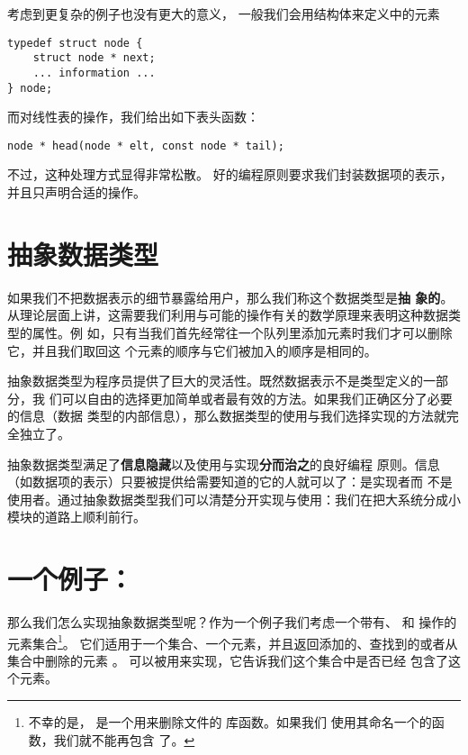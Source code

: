 考虑到更复杂的例子也没有更大的意义，
一般我们会用结构体来定义中的元素
\begin{lstlisting}
typedef struct node {
	struct node * next;
	... information ...
} node;
\end{lstlisting}
而对线性表的操作，我们给出如下表头函数：
\begin{lstlisting}
node * head(node * elt, const node * tail);
\end{lstlisting}

不过，这种处理方式显得非常松散。
好的编程原则要求我们封装数据项的表示，并且只声明合适的操作。

\section{抽象数据类型}

如果我们不把数据表示的细节暴露给用户，那么我们称这个数据类型是\textbf{抽
象的}。
从理论层面上讲，这需要我们利用与可能的操作有关的数学原理来表明这种数据类型的属性。例
如，只有当我们首先经常往一个队列里添加元素时我们才可以删除它，并且我们取回这
个元素的顺序与它们被加入的顺序是相同的。

抽象数据类型为程序员提供了巨大的灵活性。既然数据表示不是类型定义的一部分，我
们可以自由的选择更加简单或者最有效的方法。如果我们正确区分了必要的信息（数据
类型的内部信息），那么数据类型的使用与我们选择实现的方法就完全独立了。

抽象数据类型满足了\textbf{信息隐藏}以及使用与实现\textbf{分而治之}的良好编程
原则。信息（如数据项的表示）只要被提供给需要知道的它的人就可以了：是实现者而
不是使用者。通过抽象数据类型我们可以清楚分开实现与使用：我们在把大系统分成小
模块的道路上顺利前行。

\section{一个例子：}
那么我们怎么实现抽象数据类型呢？作为一个例子我们考虑一个带有、
 和 操作的元素集合\footnote{
不幸的是， 是一个用来删除文件的 库函数。如果我们
使用其命名一个的函数，我们就不能再包含 了。}。
它们适用于一个集合、一个元素，并且返回添加的、查找到的或者从集合中删除的元素
。 可以被用来实现，它告诉我们这个集合中是否已经
包含了这个元素。

